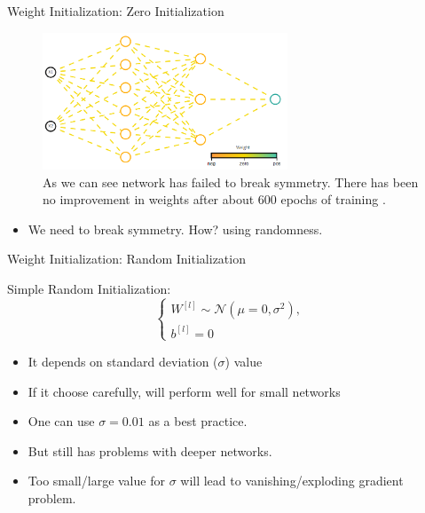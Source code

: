 \begin{frame}{Weight Initialization: Zero Initialization}
	\begin{figure}[H]
		\centering
		\includegraphics[width=0.65\textwidth]{Images/zero-init.png}
		\caption{As we can see network has failed to break symmetry. There has been no improvement in weights after about 600 epochs of training \cite{katanforoosh-kunin}.}
	\end{figure}
	\hspace*{2em}
	\begin{itemize}
		\item We need to break symmetry. How? using randomness.
	\end{itemize}
\end{frame}

\begin{frame}{Weight Initialization: Random Initialization}
	\begin{block}{Simple Random Initialization:}
		\[
		\begin{cases}
			W^{[l]} \sim \mathcal{N}\left(\mu=0, \sigma^2\right), \\
			b^{[l]} = 0
		\end{cases}
		\]
	\end{block}
	\hspace*{2em}
	\pause
	\begin{itemize}
		\item It depends on standard deviation ($\sigma$) value
		\item If it choose carefully, will perform well for small networks
		\item One can use $\sigma = 0.01$ as a best practice.
		\item But still has problems with deeper networks.
		\item Too small/large value for $\sigma$ will lead to vanishing/exploding gradient problem.
	\end{itemize}
\end{frame}

